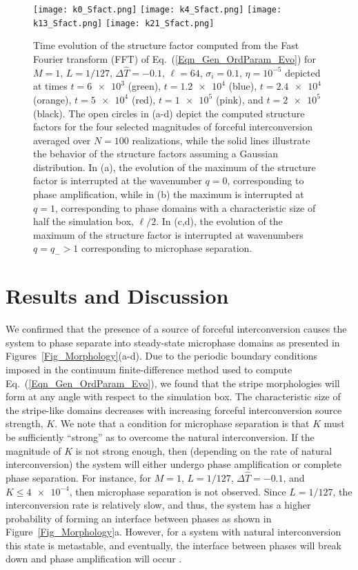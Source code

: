 \documentclass[5p,twocolumn]{elsarticle}
\begin{document}
\begin{figure}[t]
     \centering
    \texttt{[image: k0\_Sfact.png]}
    \texttt{[image: k4\_Sfact.png]}
    \texttt{[image: k13\_Sfact.png]}
    \texttt{[image: k21\_Sfact.png]}
    \caption{Time evolution of the structure factor computed from the Fast Fourier transform (FFT) of Eq.~(\ref{Eqn_Gen_OrdParam_Evo}) for $M=1$, $L=1/127$, $\Delta\hat{T}=-0.1$, $\ell=64$, $\sigma_i=0.1$, $\eta=10^{-5}$ depicted at times $t=\num{6e3}$ (green), $t=\num{1.2e4}$ (blue), $t=\num{2.4e4}$ (orange), $t=\num{5e4}$ (red), $t=\num{1e5}$ (pink), and $t=\num{2e5}$ (black). The open circles in (a-d) depict the computed structure factors for the four selected magnitudes of forceful interconversion averaged over $N=100$ realizations, while the solid lines illustrate the behavior of the structure factors assuming a Gaussian distribution. In (a), the evolution of the maximum of the structure factor is interrupted at the wavenumber $q=0$, corresponding to phase amplification, while in (b) the maximum is interrupted at $q=1$, corresponding to phase domains with a characteristic size of half the simulation box, $\ell/2$. In (c,d), the evolution of the maximum of the structure factor is interrupted at wavenumbers $q=q_->1$ corresponding to microphase separation.}
    \label{Fig_Sfact_Morphs}
\end{figure}

\section{Results and Discussion}
We confirmed that the presence of a source of forceful interconversion causes the system to phase separate into steady-state microphase domains as presented in Figures~\ref{Fig_Morphology}(a-d). Due to the periodic boundary conditions imposed in the continuum finite-difference method used to compute Eq.~(\ref{Eqn_Gen_OrdParam_Evo}), we found that the stripe morphologies will form at any angle with respect to the simulation box. The characteristic size of the stripe-like domains decreases with increasing forceful interconversion source strength, $K$. We note that a condition for microphase separation is that $K$ must be sufficiently ``strong'' as to overcome the natural interconversion. If the magnitude of $K$ is not strong enough, then (depending on the rate of natural interconversion) the system will either undergo phase amplification or complete phase separation. For instance, for $M=1$, $L=1/127$, $\Delta \hat{T} = -0.1$, and $K \le \num{4e-4}$, then microphase separation is not observed. Since $L=1/127$, the interconversion rate is relatively slow, and thus, the system has a higher probability of forming an interface between phases as shown in Figure~\ref{Fig_Morphology}a. However, for a system with natural interconversion this state is metastable, and  eventually, the interface between phases will break down and phase amplification will occur \cite{Shum_Phase_2021}. 
\end{document}
